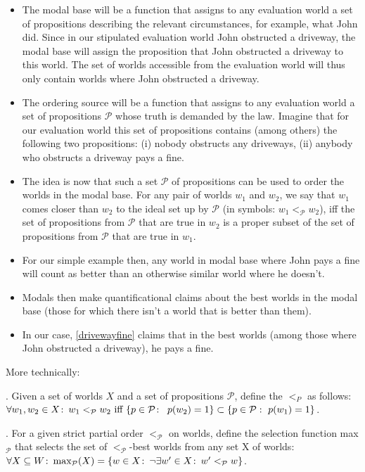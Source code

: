 \begin{itemize}
	\item The modal base will be a function that assigns to any evaluation world a set of propositions describing the relevant circumstances, for example, what John did. Since in our stipulated evaluation world John obstructed a driveway, the modal base will assign the proposition that John obstructed a driveway to this world. The set of worlds accessible from the evaluation world will thus only contain worlds where John obstructed a driveway. 
	\item The ordering source will be a function that assigns to any evaluation world a set of propositions $\mathcal{P}$ whose truth is demanded by the law. Imagine that for our evaluation world this set of propositions contains (among others) the following two propositions: (i) nobody obstructs any driveways, (ii) anybody who obstructs a driveway pays a fine. 
	\item The idea is now that such a set $\mathcal{P}$ of propositions can be used to order the worlds in the modal base. For any pair of worlds $w_1$ and $w_2$, we say that $w_1$ comes closer than $w_2$ to the ideal set up by $\mathcal{P}$ (in symbols: $w_1 <_{\mathcal{P}} w_2$), iff the set of propositions from $\mathcal{P}$ that are true in $w_2$ is a proper subset of the set of propositions from $\mathcal{P}$ that are true in $w_1$. 
	\item For our simple example then, any world in modal base where John pays a fine will count as better than an otherwise similar world where he doesn't. 
	\item Modals then make quantificational claims about the best worlds in the modal base (those for which there isn't a world that is better than them). 
	\item In our case, \ref{drivewayfine} claims that in the best worlds (among those where John obstructed a driveway), he pays a fine. 
\end{itemize}
%
More technically:

\ex. Given a set of worlds $X$ and a set of propositions $\mathcal{P}$, define the  $<_P$ as follows:\\
$\forall w_1,w_2 \in X\colon\thinspace w_1 <_{\mathcal{P}} w_2 \mbox{ iff } \{p \in \mathcal{P}\colon\thinspace\ p(w_2)=1\} \subset \{p \in \mathcal{P}:\ p(w_1)=1\}$.

\ex. For a given strict partial order $<_{\mathcal{P}}$ on worlds, define the selection function max$_{\mathcal{P}}$ that selects the set of $<_{\mathcal{P}}$-best worlds from any set X of worlds:\\
$\forall X \subseteq W\colon\thinspace \mbox{max}_{\mathcal{P}}(X) = \left\{ w \in X\colon\thinspace \neg \exists w' \in X\colon\thinspace w' <_{\mathcal{P}} w \right\}$.

